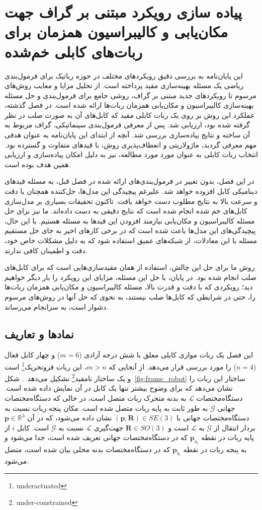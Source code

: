 \chapter{پیاده سازی رویکرد مبتنی بر گراف جهت مکان‌یابی و کالیبراسیون همزمان برای ربات‌های کابلی خم‌شده}
این پایان‌نامه به بررسی دقیق رویکردهای مختلف در حوزه رباتیک برای فرمول‌بندی ریاضی یک مسئله بهینه‌سازی مقید پرداخته است. از تحلیل مزایا و معایب روش‌های مرسوم تا رویکردهای جدید مبتنی بر گراف، روشی جامع برای فرمول‌بندی و حل مسئله بهینه‌سازی کالیبراسیون و مکان‌یابی همزمان ربات‌ها ارائه شده است. در فصل گذشته، عملکرد این روش بر روی یک ربات کابلی مقید که کابل‌های آن به صورت صلب در نظر گرفته شده بود، ارزیابی شد. پس از معرفی فرمول‌بندی سینماتیکی، گراف مربوط به آن ساخته و نتایج پیاده‌سازی بررسی شد. آنچه از ابتدای این پایان‌نامه به عنوان هدفی مهم معرفی گردید، ماژولاریتی و انعطاف‌پذیری روش، با قیدهای متفاوت و گسترده بود. انتخاب ربات کابلی به عنوان مورد مورد مطالعه، نیز به دلیل امکان پیاده‌سازی و ارزیابی همین هدف بوده است.

در این فصل، بدون تغییر در فرمول‌بندی‌های ارائه شده در فصل قبل، به مسئله قیدهای دینامیکی کابل افزوده خواهد شد. علیرغم پیچیدگی این مدل‌ها، حل‌کننده همچنان با دقت و سرعت بالا به نتایج مطلوب دست خواهد یافت. تاکنون تحقیقات بسیاری بر مدل‌سازی کابل‌های خم شده انجام شده است که نتایج دقیقی به دست داده‌اند. ما نیز برای حل مسئله کالیبراسیون و مکان‌یابی نیازمند افزودن این قیدها به مسئله هستیم. با این حال، پیچیدگی‌های این مدل‌ها باعث شده است که در برخی کارهای اخیر به جای حل مستقیم مسئله با این معادلات، از شبکه‌های عمیق استفاده شود که به دلیل مشکلات خاص خود، دقت و اطمینان کافی ندارند.

روش ما برای حل این چالش، استفاده از همان مقیدسازی‌هایی است که برای کابل‌های صلب انجام شده بود. در پایان، با حل این مسئله، مزایای این رویکرد را بار دیگر خواهیم دید؛ رویکردی که با دقت و قدرت بالا، مسئله کالیبراسیون و مکان‌یابی همزمان ربات‌ها را، حتی در شرایطی که کابل‌ها صلب نیستند، به نحوی که حل آنها در روش‌های مرسوم دشوار است، به سرانجام می‌رساند.



\section{نمادها و تعاریف} \label{subsec:Assm}
این فصل یک ربات موازی کابلی معلق با شش درجه آزادی ($m=6$) و چهار کابل فعال ($n=4$) را مورد بررسی قرار می‌دهد. از آنجایی که $m>n$، این ربات فروتحریک\footnote{underactuated}
 است و یک ساختار نامقید\footnote{under-constrained}
تشکیل می‌دهد~\cite{ida2021natural}. 
شکل~\ref{fig:frame_robot} ساختار این ربات را نشان می‌دهد که برای وضوح بیشتر تنها یک کابل در آن نمایش داده شده است. 
دستگاه‌مختصات $\mathcal{L}$ به بدنه متحرک ربات متصل است، در حالی که دستگاه‌مختصات جهانی $\mathcal{G}$ به طور ثابت به پایه ربات متصل شده است. مکان پنجه ربات نسبت به دستگاه‌مختصات جهانی با
 $(\bm{p},\bm{R}) \in SE(3)$
نشان داده می‌شود، که در آن
 $\bm{p} \in \mathbb{R}^3$
بردار انتقال از $\mathcal{G}$ به $\mathcal{L}$ است و
 $\bm{R} \in SO(3)$
جهت‌گیری $\mathcal{L}$ نسبت به $\mathcal{G}$ است. کابل $i$ از پایه ربات در نقطه $\bm{p}_{a_i}$ که در دستگاه‌مختصات جهانی تعریف شده است، جدا می‌شود و به پنجه ربات در نقطه $\bm{p}_{b_i}$ که در دستگاه‌مختصات بدنه محلی بیان شده است، متصل می‌شود.

